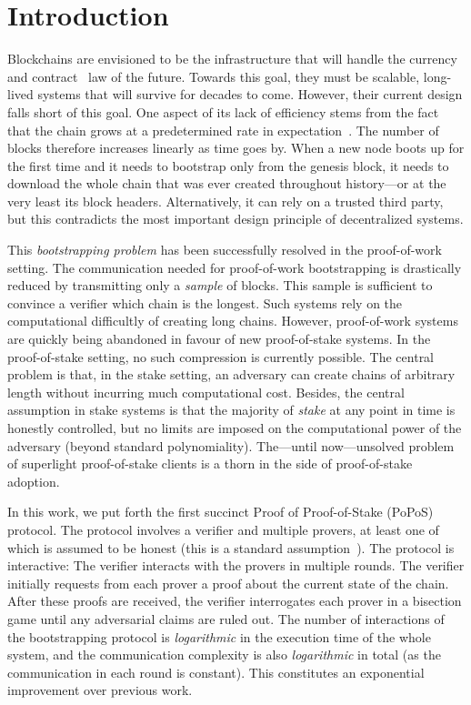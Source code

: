 \section{Introduction}

Blockchains are envisioned to be the infrastructure that will handle the currency~\cite{bitcoin} and contract~\cite{buterin,wood}
law of the future. Towards this goal, they must be scalable, long-lived systems that will
survive for decades to come. However, their current design falls short of this goal. One
aspect of its lack of efficiency stems from the fact that the chain grows at a predetermined
rate in expectation~\cite{sok}. The number of blocks therefore increases linearly as time goes by.
When a new node boots up for the first time and it needs to bootstrap only from the genesis
block, it needs to download the whole chain that was ever created throughout history---or
at the very least its block headers. Alternatively, it can rely on a trusted third party,
but this contradicts the most important design principle of decentralized systems.

This \emph{bootstrapping problem} has been successfully resolved in the proof-of-work
setting. The communication needed for proof-of-work bootstrapping is drastically reduced
by transmitting only a
\emph{sample} of blocks. This sample is sufficient to convince
a verifier which chain is the longest. Such systems rely on the
computational difficultly of creating long chains. However, proof-of-work systems are
quickly being abandoned in favour of new proof-of-stake systems. In the proof-of-stake
setting, no such compression is currently possible. The central problem is that, in the
stake setting, an adversary can create chains of arbitrary length without incurring much
computational cost. Besides, the central assumption in stake systems is that the
majority of \emph{stake} at any point in time is honestly controlled, but no limits are
imposed on the computational power of the adversary (beyond standard polynomiality).
The---until now---unsolved problem of superlight proof-of-stake clients is a thorn in the
side of proof-of-stake adoption.

In this work, we put forth the first succinct Proof of Proof-of-Stake (PoPoS) protocol.
The protocol involves a verifier and multiple provers, at least one of which is assumed
to be honest (this is a standard
assumption~\cite{backbone,backbone-new,varbackbone,pass-asynchronous}). The protocol is interactive:
The verifier interacts with the provers in multiple rounds. The verifier initially requests from
each prover a proof about the current state of the chain. After these proofs are received,
the verifier interrogates each prover in a bisection game until any adversarial claims
are ruled out. The number of interactions of the bootstrapping protocol is \emph{logarithmic}
in the execution time of the whole system, and the communication complexity is also \emph{logarithmic}
in total (as the communication in each round is constant). This constitutes an exponential
improvement over previous work.

